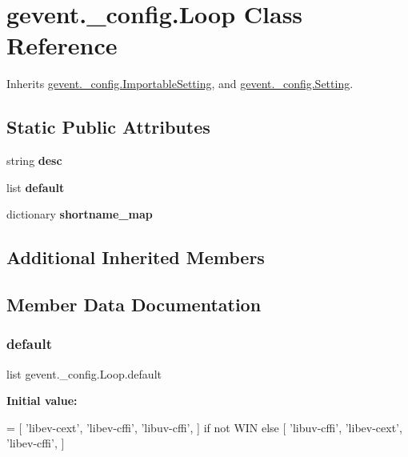 \hypertarget{classgevent_1_1__config_1_1_loop}{}\section{gevent.\+\_\+config.\+Loop Class Reference}
\label{classgevent_1_1__config_1_1_loop}


Inherits \hyperlink{classgevent_1_1__config_1_1_importable_setting}{gevent.\+\_\+config.\+Importable\+Setting}, and \hyperlink{classgevent_1_1__config_1_1_setting}{gevent.\+\_\+config.\+Setting}.

\subsection*{Static Public Attributes}
\begin{DoxyCompactItemize}
\item 
string {\bfseries desc}
\item 
list {\bfseries default}
\item 
dictionary {\bfseries shortname\+\_\+map}
\end{DoxyCompactItemize}
\subsection*{Additional Inherited Members}


\subsection{Member Data Documentation}
\mbox{\label{classgevent_1_1__config_1_1_loop_a8decfd5bfd7e209ce848476205748382}} 
\subsubsection{\texorpdfstring{default}{default}}
{\footnotesize\ttfamily list gevent.\+\_\+config.\+Loop.\+default\hspace{0.3cm}{\ttfamily [static]}}

{\bfseries Initial value\+:}
\begin{DoxyCode}
=  [
        \textcolor{stringliteral}{'libev-cext'},
        \textcolor{stringliteral}{'libev-cffi'},
        \textcolor{stringliteral}{'libuv-cffi'},
    ] \textcolor{keywordflow}{if} \textcolor{keywordflow}{not} WIN \textcolor{keywordflow}{else} [
        \textcolor{stringliteral}{'libuv-cffi'},
        \textcolor{stringliteral}{'libev-cext'},
        \textcolor{stringliteral}{'libev-cffi'},
    ]
\end{DoxyCode}
\mbox{\label{classgevent_1_1__config_1_1_loop_a65a3c334e9325bf3a56601dd8be881df}} 
